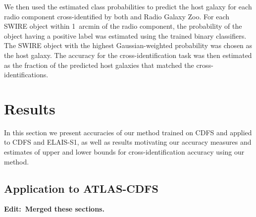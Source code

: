 \documentclass[fleqn,usenatbib,usedcolumn]{mnras}
\newcommand{\edit}[1]{{\bf Edit:~{#1}}}
\begin{document}
    We then used the estimated class probabilities to predict the host galaxy for
    each radio component cross-identified by both \citet{norris06} and Radio
    Galaxy Zoo. For each SWIRE object within 1~arcmin of the radio component,
    the probability of the object having a positive label was estimated using
    the trained binary classifiers. The SWIRE object with the highest Gaussian-weighted
    probability was chosen as the host galaxy. The accuracy for the cross-identification task was then estimated
    as the fraction of the predicted host galaxies that matched the \citet{norris06} cross-identifications.

\section{Results}\label{sec:results}

  In this section we present accuracies of our method trained on CDFS and applied to CDFS and ELAIS-S1, as well as results motivating our accuracy
  measures and estimates of upper and lower bounds for cross-identification accuracy using our method.

  \subsection{Application to ATLAS-CDFS}

    \edit{Merged these sections.}
\end{document}
